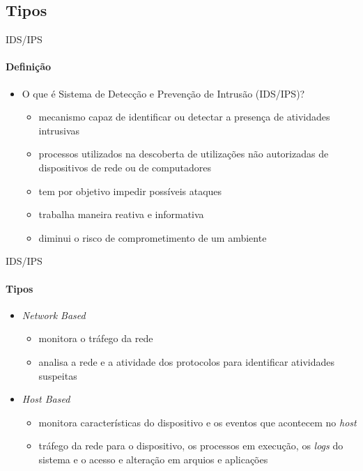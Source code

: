 \documentclass[aspectratio=169]{beamer}
\begin{document}
\subsection{Tipos}
\begin{frame}{IDS/IPS}
  \framesubtitle{Definição}
  \begin{itemize}
	\item O que é Sistema de Detecção e Prevenção de Intrusão (IDS/IPS)?
	\begin{itemize}
		\item mecanismo capaz de identificar ou detectar a presença de atividades intrusivas
		\item processos utilizados na descoberta de utilizações não autorizadas de dispositivos de rede ou de computadores
		\item tem por objetivo impedir possíveis ataques
		\item trabalha maneira reativa e informativa
		\item diminui o risco de comprometimento de um ambiente 
	\end{itemize}
  \end{itemize}
\end{frame}

\begin{frame}{IDS/IPS}
	\framesubtitle{Tipos}
	\begin{itemize}
		\item \textit{Network Based}
			\begin{itemize}
				\item monitora o tráfego da rede
				\item analisa a rede e a atividade dos protocolos para identificar atividades suspeitas 			
			\end{itemize}				
		\item \textit{Host Based}
			\begin{itemize}
				\item monitora características do dispositivo e os eventos que acontecem no \textit{host}
				\item tráfego da rede para o dispositivo, os processos em execução, os \textit{logs} do sistema e o acesso e alteração em arquios e aplicações
			\end{itemize}
	\end{itemize}
\end{frame}
\end{document}
